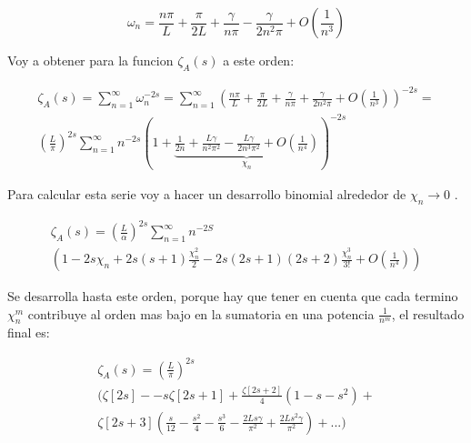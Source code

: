 \begin{equation}
    \omega _n = 
	\frac{n \pi}{L} + 
    \frac{\pi}{2 L} +
    \frac{\gamma}{n \pi} -
    \frac{\gamma}{2 n ^2 \pi} +
    O \left(  \frac{1}{n^3} \right) 
\end{equation}
    
Voy a obtener para la funcion $ \zeta _A (s)$ a este orden:
    
\begin{equation}
\begin{array}{cc}
    \zeta _{A} (s) =  \sum _{n=1} ^{\infty} \omega _n ^ {-2 s} =
    \sum _{n=1} ^{\infty} 
    \left(
	\frac{n \pi}{L} + 
    \frac{\pi}{2 L} +
    \frac{\gamma}{n \pi} +
    \frac{\gamma}{2 n ^2 \pi} +
    O \left(  \frac{1}{n^3} \right) 
    \right) ^{-2 s} = \\
    ( \frac{L}{\pi} ) ^{2s}    
    \sum _{n=1} ^{\infty} 
    n ^{- 2 s} 
    \left(
    1 +     
    \underbrace{
        \frac{1}{2 n} + 
        \frac{L \gamma}{n^2 \pi ^2} -
        \frac{L \gamma}{2 n ^3 \pi ^2} +
        O(\frac{1}{n ^{4}} ) } _{ \chi _n}
    \right ) ^{-2 s}
\end{array}
\end{equation}

Para calcular esta serie voy a hacer un desarrollo binomial alrededor de $\chi _n \rightarrow{0} $  .

\begin{equation}
\begin{array}{c}
\zeta _{A} (s) = 
( \frac{L}{\alpha} ) ^{2s}
\sum _{n=1} ^{\infty}
  n  ^{-2 S} \\
(
1 - 2 s \chi _n + 2 s(s+1) \frac{\chi _n ^2}{2} - 2s(2s+1)(2s+2) \frac{ \chi _n ^3}{3!}  + O( \frac{1}{n ^4}) )

\end{array}
\end{equation}

Se desarrolla hasta este orden, porque hay que tener en cuenta que cada termino $\chi _{n} ^{m} $ contribuye al orden mas bajo en la sumatoria en una potencia $\frac{1}{n ^m}$, el resultado final es:





\begin{equation}
\begin{array}{c}
    \zeta _A (s) = \left( \frac{L}{\pi} \right) ^{2s} \\
	\Bigg(
		\zeta [2 s] -
		-s \zeta [2s+1 ] +
		 \frac{\zeta [2s +2 ]}{4} \left( 1 - s - s^2 \right) + \\
		 \zeta [2s+3] \left(  
							\frac{s}{12} - \frac{s ^2}{4} - \frac{s ^3}{6} -
							\frac{2 L s \gamma}{\pi ^2} + \frac{2 L s^2 \gamma}{\pi ^2}
		 									\right) 
		+ ...
		\Bigg)
\end{array}
\end{equation}


